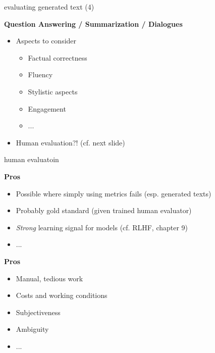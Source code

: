 
\begin{vbframe}{evaluating generated text (4)}

\vfill

\textbf{Question Answering / Summarization / Dialogues}

\begin{itemize}
	\item Aspects to consider
			\begin{itemize}
				\item Factual correctness
				\item Fluency
				\item Stylistic aspects
				\item Engagement
				\item ...
			\end{itemize}
	\item Human evaluation?! (cf. next slide)
\end{itemize}

\vfill

\end{vbframe}


\begin{vbframe}{human evaluatoin}

\vfill

\textbf{Pros}

\begin{itemize}
	\item Possible where simply using metrics fails (esp. generated texts)
	\item Probably gold standard (given trained human evaluator)
	\item \textit{Strong} learning signal for models (cf. RLHF, chapter 9)
	\item ...
\end{itemize}

\vspace{.3cm}

\textbf{Pros}

\begin{itemize}
	\item Manual, tedious work
  \item Costs and working conditions
	\item Subjectiveness
	\item Ambiguity
	\item ...
\end{itemize}

\vfill

\end{vbframe}

